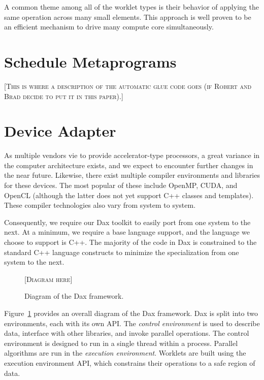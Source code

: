 \documentclass[conference]{IEEEtran}
\newcommand*{\keyterm}[1]{\emph{#1}}
\newcommand{\fix}[1]{{\color{red}\textsc{[#1]}}}
\begin{document}
A common theme among all of the worklet types is their behavior of applying
the same operation across many small elements.  This approach is well
proven to be an efficient mechanism to drive many compute core
simultaneously.

\section{Schedule Metaprograms}
\label{sec:ScheduleMetaprograms}

\noindent
\fix{This is where a description of the automatic glue code goes (if Robert
  and Brad decide to put it in this paper).}

\section{Device Adapter}
\label{sec:DeviceAdapter}

\noindent
As multiple vendors vie to provide accelerator-type processors, a great
variance in the computer architecture exists, and we expect to encounter
further changes in the near future.  Likewise, there exist multiple
compiler environments and libraries for these devices.  The most popular of
these include OpenMP, CUDA, and OpenCL (although the latter does not yet
support C++ classes and templates).  These compiler technologies also vary
from system to system.

Consequently, we require our Dax toolkit to easily port from one system to
the next.  At a minimum, we require a base language support, and the
language we choose to support is C++.  The majority of the code in Dax is
constrained to the standard C++ language constructs to minimize the
specialization from one system to the next.

\begin{figure}[htb]
  \centering
  \fix{Diagram here}
  \caption{Diagram of the Dax framework.}
  \label{fig:DaxDiagram}
\end{figure}

Figure~\ref{fig:DaxDiagram} provides an overall diagram of the Dax
framework.  Dax is split into two environments, each with its own API.  The
\keyterm{control environment} is used to describe data, interface with
other libraries, and invoke parallel operations.  The control environment
is designed to run in a single thread within a process.  Parallel
algorithms are run in the \keyterm{execution environment}.  Worklets are
built using the execution environment API, which constrains their
operations to a safe region of data.
\end{document}
